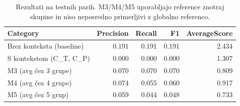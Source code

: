 \begin{table}[h]
\centering
\caption{Rezultati na testnih parih. M3/M4/M5 uporabljajo reference znotraj skupine in niso neposredno primerljivi z globalno referenco.}
\label{tab:table_4_5}
\begin{tabular}{lrrrr}
\toprule
Category & Precision & Recall & F1 & AverageScore \\
\midrule
Brez konteksta (baseline) & 0.191 & 0.191 & 0.191 & 2.434 \\
S kontekstom (C\_T, C\_P) & 0.000 & 0.000 & 0.000 & 1.307 \\
M3 (avg čez 3 grupe) & 0.070 & 0.070 & 0.070 & 0.809 \\
M4 (avg čez 4 grupe) & 0.074 & 0.055 & 0.060 & 0.917 \\
M5 (avg čez 5 grup) & 0.059 & 0.044 & 0.048 & 0.733 \\
\bottomrule
\end{tabular}

\end{table}
